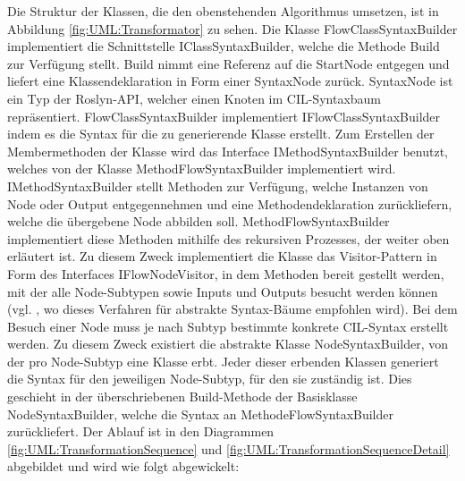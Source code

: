 Die Struktur der Klassen, die den obenstehenden Algorithmus umsetzen, ist in Abbildung \ref{fig:UML:Transformator} zu sehen. Die Klasse FlowClassSyntaxBuilder implementiert die Schnittstelle IClassSyntaxBuilder, welche die Methode Build zur Verfügung stellt. Build nimmt eine Referenz auf die StartNode entgegen und liefert eine Klassendeklaration in Form einer SyntaxNode zurück. SyntaxNode ist ein Typ der Roslyn-API, welcher einen Knoten im CIL-Syntaxbaum repräsentiert. FlowClassSyntaxBuilder implementiert IFlowClassSyntaxBuilder indem es die Syntax für die zu generierende Klasse erstellt. Zum Erstellen der Membermethoden der Klasse wird das Interface IMethodSyntaxBuilder benutzt, welches von der Klasse MethodFlowSyntaxBuilder implementiert wird. IMethodSyntaxBuilder stellt Methoden zur Verfügung, welche Instanzen von Node oder Output entgegennehmen und eine Methodendeklaration zurückliefern, welche die übergebene Node abbilden soll. MethodFlowSyntaxBuilder implementiert diese Methoden mithilfe des rekursiven Prozesses, der weiter oben erläutert ist. Zu diesem Zweck implementiert die Klasse das Visitor-Pattern in Form des Interfaces IFlowNodeVisitor, in dem Methoden bereit gestellt werden, mit der alle Node-Subtypen sowie Inputs und Outputs besucht werden können (vgl. \cite[S. 5f]{Jones}, wo dieses Verfahren für abstrakte Syntax-Bäume empfohlen wird). Bei dem Besuch einer Node muss je nach Subtyp bestimmte konkrete CIL-Syntax erstellt werden. Zu diesem Zweck existiert die abstrakte Klasse NodeSyntaxBuilder, von der pro Node-Subtyp eine Klasse erbt. Jeder dieser erbenden Klassen generiert die Syntax für den jeweiligen Node-Subtyp, für den sie zuständig ist. Dies geschieht in der überschriebenen Build-Methode der Basisklasse NodeSyntaxBuilder, welche die Syntax an MethodeFlowSyntaxBuilder zurückliefert. Der Ablauf ist in den Diagrammen \ref{fig:UML:TransformationSequence} und \ref{fig:UML:TransformationSequenceDetail} abgebildet und wird wie folgt abgewickelt:
\newline
